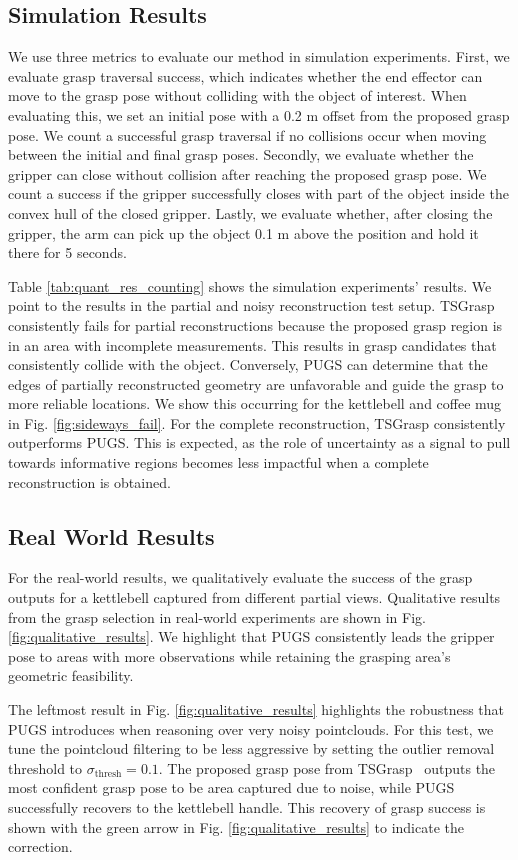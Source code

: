 \subsection{Simulation Results}
We use three metrics to evaluate our method in simulation experiments.
First, we evaluate grasp traversal success, which indicates whether the end effector can move to the grasp pose without colliding with the object of interest.
When evaluating this, we set an initial pose with a 0.2 m offset from the proposed grasp pose.
We count a successful grasp traversal if no collisions occur when moving between the initial and final grasp poses.
Secondly, we evaluate whether the gripper can close without collision after reaching the proposed grasp pose. 
We count a success if the gripper successfully closes with part of the object inside the convex hull of the closed gripper.
Lastly, we evaluate whether, after closing the gripper, the arm can pick up the object 0.1 m above the position and hold it there for 5 seconds.

Table \ref{tab:quant_res_counting} shows the simulation experiments' results.
We point to the results in the partial and noisy reconstruction test setup.
TSGrasp consistently fails for partial reconstructions because the proposed grasp region is in an area with incomplete measurements.
This results in grasp candidates that consistently collide with the object.
Conversely, PUGS can determine that the edges of partially reconstructed geometry are unfavorable and guide the grasp to more reliable locations.
We show this occurring for the kettlebell and coffee mug in Fig. \ref{fig:sideways_fail}.
For the complete reconstruction, TSGrasp consistently outperforms PUGS.
This is expected, as the role of uncertainty as a signal to pull towards informative regions becomes less impactful when a complete reconstruction is obtained.

\subsection{Real World Results}
For the real-world results, we qualitatively evaluate the success of the grasp outputs for a kettlebell captured from different partial views.
Qualitative results from the grasp selection in real-world experiments are shown in Fig. \ref{fig:qualitative_results}.
We highlight that PUGS consistently leads the gripper pose to areas with more observations while retaining the grasping area's geometric feasibility.

The leftmost result in Fig. \ref{fig:qualitative_results} highlights the robustness that PUGS introduces when reasoning over very noisy pointclouds.
For this test, we tune the pointcloud filtering to be less aggressive by setting the outlier removal threshold to $\sigma_\text{thresh}=0.1$.
The proposed grasp pose from TSGrasp~\cite{player_real-time_2023} outputs the most confident grasp pose to be area captured due to noise, while PUGS successfully recovers to the kettlebell handle. 
This recovery of grasp success is shown with the green arrow in Fig. \ref{fig:qualitative_results} to indicate the correction.
